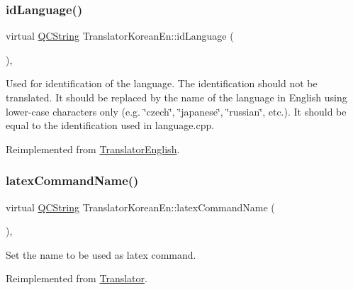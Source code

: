 \subsubsection{\texorpdfstring{idLanguage()}{idLanguage()}}
{\footnotesize\ttfamily virtual \mbox{\hyperlink{class_q_c_string}{Q\+C\+String}} Translator\+Korean\+En\+::id\+Language (\begin{DoxyParamCaption}{ }\end{DoxyParamCaption})\hspace{0.3cm}{\ttfamily [inline]}, {\ttfamily [virtual]}}

Used for identification of the language. The identification should not be translated. It should be replaced by the name of the language in English using lower-\/case characters only (e.\+g. \char`\"{}czech\char`\"{}, \char`\"{}japanese\char`\"{}, \char`\"{}russian\char`\"{}, etc.). It should be equal to the identification used in language.\+cpp. 

Reimplemented from \mbox{\hyperlink{class_translator_english_a940d6ef2aa0aa8a8011426219d145a53}{Translator\+English}}.

\mbox{\label{class_translator_korean_en_a3b71d2ee009c7e529e60cb43898bcce7}} 
\subsubsection{\texorpdfstring{latexCommandName()}{latexCommandName()}}
{\footnotesize\ttfamily virtual \mbox{\hyperlink{class_q_c_string}{Q\+C\+String}} Translator\+Korean\+En\+::latex\+Command\+Name (\begin{DoxyParamCaption}{ }\end{DoxyParamCaption})\hspace{0.3cm}{\ttfamily [inline]}, {\ttfamily [virtual]}}

Set the name to be used as latex command. 

Reimplemented from \mbox{\hyperlink{class_translator_a9e87df46e59ca15713f43205aeb17ea0}{Translator}}.

\mbox{\label{class_translator_korean_en_a0db5fe9ae0843e3f89b0b9770ba32d32}} 
